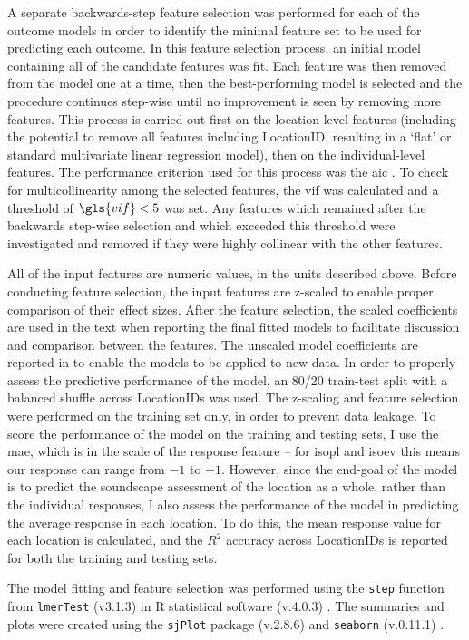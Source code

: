    A separate backwards-step feature selection was performed for each of the outcome models in order to identify the minimal feature set to be used for predicting each outcome. In this feature selection process, an initial model containing all of the candidate features was fit. Each feature was then removed from the model one at a time, then the best-performing model is selected and the procedure continues step-wise until no improvement is seen by removing more features. This process is carried out first on the location-level features (including the potential to remove all features including LocationID, resulting in a `flat' or standard multivariate linear regression model), then on the individual-level features. The performance criterion used for this process was the \gls{aic} \citep{Akaike1974new}. To check for multicollinearity among the selected features, the \gls{vif} was calculated and a threshold of $\gls{vif} < 5$ was set. Any features which remained after the backwards step-wise selection and which exceeded this threshold were investigated and removed if they were highly collinear with the other features.

   All of the input features are numeric values, in the units described above. Before conducting feature selection, the input features are z-scaled to enable proper comparison of their effect sizes. After the feature selection, the scaled coefficients are used in the text when reporting the final fitted models to facilitate discussion and comparison between the features. The unscaled model coefficients are reported in  to enable the models to be applied to new data. In order to properly assess the predictive performance of the model, an 80/20 train-test split with a balanced shuffle across LocationIDs was used. The z-scaling and feature selection were performed on the training set only, in order to prevent data leakage. To score the performance of the model on the training and testing sets, I use the \gls{mae}, which is in the scale of the response feature -- for \gls{isopl} and \gls{isoev} this means our response can range from $-1$ to $+1$. However, since the end-goal of the model is to predict the soundscape assessment of the location as a whole, rather than the individual responses, I also assess the performance of the model in predicting the average response in each location. To do this, the mean response value for each location is calculated, and the $R^2$ accuracy across LocationIDs is reported for both the training and testing sets.

   The model fitting and feature selection was performed using the \texttt{step} function from \texttt{lmerTest} (v3.1.3) \citep{Kuznetsova2017lmerTest} in R statistical software (v.4.0.3) \citep{RCT2018R}. The summaries and plots were created using the \texttt{sjPlot} package (v.2.8.6) \citep{Luedecke2021sjPlot} and \texttt{seaborn} (v.0.11.1) \citep{Waskom2021seaborn}.

